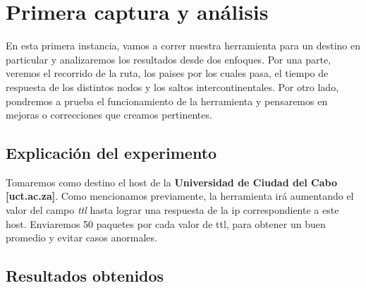 \section{Primera captura y análisis}
\par En esta primera instancia, vamos a correr nuestra herramienta para un destino en particular y analizaremos los resultados desde dos enfoques. Por una parte, veremos el recorrido de la ruta, los paises por los cuales pasa, el tiempo de respuesta de los distintos nodos y los saltos intercontinentales. Por otro lado, pondremos a prueba el funcionamiento de la herramienta y pensaremos en mejoras o correcciones que creamos pertinentes.

\subsection{Explicación del experimento}
\par Tomaremos como destino el host de la \textbf{Universidad de Ciudad del Cabo [uct.ac.za]}. Como mencionamos previamente, la herramienta irá aumentando el valor del campo \textit{ttl} hasta lograr una respuesta de la ip correspondiente a este host. Enviaremos 50 paquetes por cada valor de ttl, para obtener un buen promedio y evitar casos anormales.

\subsection{Resultados obtenidos}

